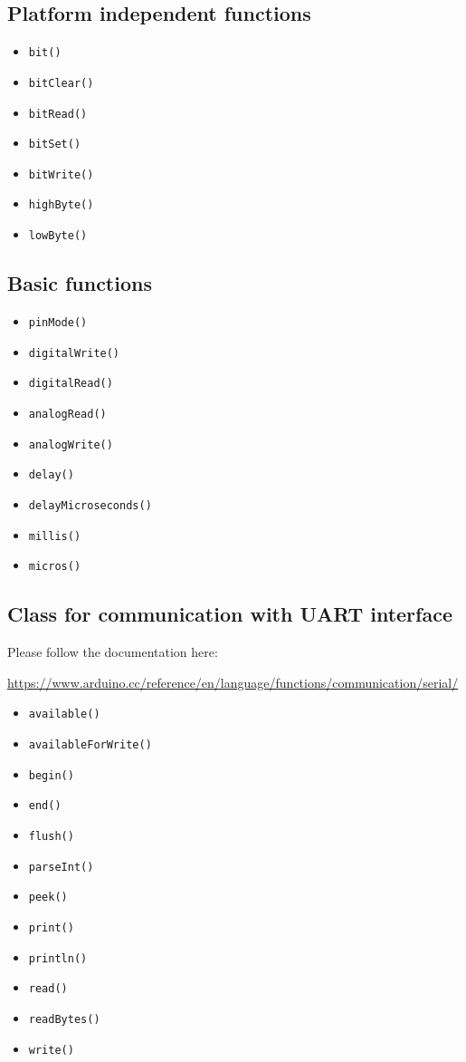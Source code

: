 \documentclass[12pt, a4paper]{article}
\begin{document}
\subsection{Platform independent functions}
\begin{itemize}
	\item \texttt{bit()}
	\item \texttt{bitClear()}
	\item \texttt{bitRead()}
	\item \texttt{bitSet()}
	\item \texttt{bitWrite()}
	\item \texttt{highByte()}
	\item \texttt{lowByte()}
\end{itemize}

\subsection{Basic functions}
\begin{itemize}
	\item \texttt{pinMode()}
	\item \texttt{digitalWrite()}
	\item \texttt{digitalRead()}
	\item \texttt{analogRead()}
	\item \texttt{analogWrite()}
	\item \texttt{delay()}
	\item \texttt{delayMicroseconds()}
	\item \texttt{millis()}
	\item \texttt{micros()}
\end{itemize}

\subsection{Class for communication with UART interface}
Please follow the documentation here:

{\footnotesize\url{https://www.arduino.cc/reference/en/language/functions/communication/serial/}}

\begin{itemize}
	\item \texttt{available()}
	\item \texttt{availableForWrite()}
	\item \texttt{begin()}
	\item \texttt{end()}
	\item \texttt{flush()}
	\item \texttt{parseInt()}
	\item \texttt{peek()}
	\item \texttt{print()}
	\item \texttt{println()}
	\item \texttt{read()}
	\item \texttt{readBytes()}
	\item \texttt{write()}
\end{itemize}
\end{document}
